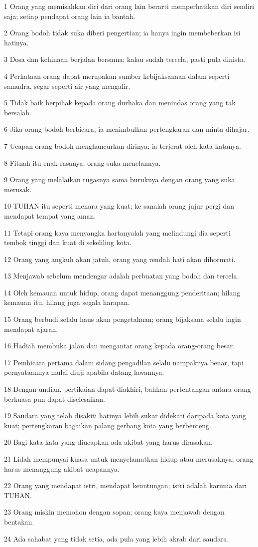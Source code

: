 \par 1 Orang yang memisahkan diri dari orang lain berarti memperhatikan diri sendiri saja; setiap pendapat orang lain ia bantah.
\par 2 Orang bodoh tidak suka diberi pengertian; ia hanya ingin membeberkan isi hatinya.
\par 3 Dosa dan kehinaan berjalan bersama; kalau sudah tercela, pasti pula dinista.
\par 4 Perkataan orang dapat merupakan sumber kebijaksanaan dalam seperti samudra, segar seperti air yang mengalir.
\par 5 Tidak baik berpihak kepada orang durhaka dan menindas orang yang tak bersalah.
\par 6 Jika orang bodoh berbicara, ia menimbulkan pertengkaran dan minta dihajar.
\par 7 Ucapan orang bodoh menghancurkan dirinya; ia terjerat oleh kata-katanya.
\par 8 Fitnah itu enak rasanya; orang suka menelannya.
\par 9 Orang yang melalaikan tugasnya sama buruknya dengan orang yang suka merusak.
\par 10 TUHAN itu seperti menara yang kuat; ke sanalah orang jujur pergi dan mendapat tempat yang aman.
\par 11 Tetapi orang kaya menyangka hartanyalah yang melindungi dia seperti tembok tinggi dan kuat di sekeliling kota.
\par 12 Orang yang angkuh akan jatuh, orang yang rendah hati akan dihormati.
\par 13 Menjawab sebelum mendengar adalah perbuatan yang bodoh dan tercela.
\par 14 Oleh kemauan untuk hidup, orang dapat menanggung penderitaan; hilang kemauan itu, hilang juga segala harapan.
\par 15 Orang berbudi selalu haus akan pengetahuan; orang bijaksana selalu ingin mendapat ajaran.
\par 16 Hadiah membuka jalan dan mengantar orang kepada orang-orang besar.
\par 17 Pembicara pertama dalam sidang pengadilan selalu nampaknya benar, tapi pernyataannya mulai diuji apabila datang lawannya.
\par 18 Dengan undian, pertikaian dapat diakhiri, bahkan pertentangan antara orang berkuasa pun dapat diselesaikan.
\par 19 Saudara yang telah disakiti hatinya lebih sukar didekati daripada kota yang kuat; pertengkaran bagaikan palang gerbang kota yang berbenteng.
\par 20 Bagi kata-kata yang diucapkan ada akibat yang harus dirasakan.
\par 21 Lidah mempunyai kuasa untuk menyelamatkan hidup atau merusaknya; orang harus menanggung akibat ucapannya.
\par 22 Orang yang mendapat istri, mendapat keuntungan; istri adalah karunia dari TUHAN.
\par 23 Orang miskin memohon dengan sopan; orang kaya menjawab dengan bentakan.
\par 24 Ada sahabat yang tidak setia, ada pula yang lebih akrab dari saudara.

